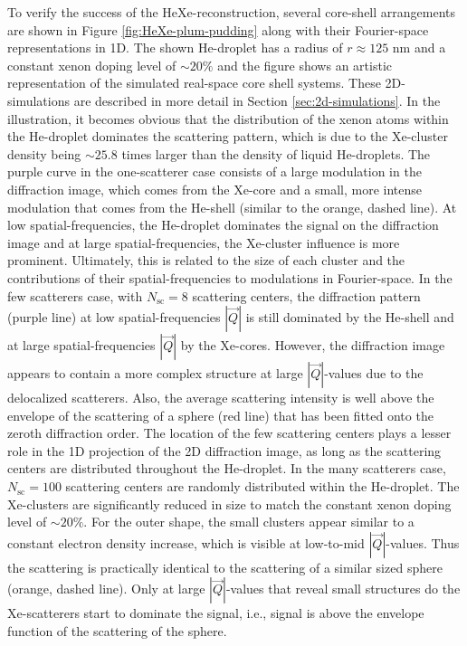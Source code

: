 To verify the success of the HeXe-reconstruction, several core-shell arrangements are shown in Figure \ref{fig:HeXe-plum-pudding} along with their Fourier-space representations in 1D. The shown He-droplet has a radius of $r\approx 125$ nm and a constant xenon doping level of $\sim 20\%$ and the figure shows an artistic representation of the simulated real-space core shell systems. These 2D-simulations are described in more detail in Section \ref{sec:2d-simulations}. In the illustration, it becomes obvious that the distribution of the xenon atoms within the He-droplet dominates the scattering pattern, which is due to the Xe-cluster density being $\sim 25.8$ times larger than the density of liquid He-droplets. The purple curve in the one-scatterer case consists of a large modulation in the diffraction image, which comes from the Xe-core and a small, more intense modulation that comes from the He-shell (similar to the orange, dashed line). At low spatial-frequencies, the He-droplet dominates the signal on the diffraction image and at large spatial-frequencies, the Xe-cluster influence is more prominent. Ultimately, this is related to the size of each cluster and the contributions of their spatial-frequencies to modulations in Fourier-space. In the few scatterers case, with $N_{\text{sc}}=8$ scattering centers, the diffraction pattern (purple line) at low spatial-frequencies $\left|\vec{Q}\right|$ is still dominated by the He-shell and at large spatial-frequencies $\left|\vec{Q}\right|$ by the Xe-cores. However, the diffraction image appears to contain a more complex structure at large $\left|\vec{Q}\right|$-values due to the delocalized scatterers. Also, the average scattering intensity is well above the envelope of the scattering of a sphere (red line) that has been fitted onto the zeroth diffraction order. The location of the few scattering centers plays a lesser role in the 1D projection of the 2D diffraction image, as long as the scattering centers are distributed throughout the He-droplet. In the many scatterers case, $N_{\text{sc}}=100$ scattering centers are randomly distributed within the He-droplet. The Xe-clusters are significantly reduced in size to match the constant xenon doping level of $\sim 20 \%$. For the outer shape, the small clusters appear similar to a constant electron density increase, which is visible at low-to-mid $\left|\vec{Q}\right|$-values. Thus the scattering is practically identical to the scattering of a similar sized sphere (orange, dashed line). Only at large $\left|\vec{Q}\right|$-values that reveal small structures do the Xe-scatterers start to dominate the signal, i.e., signal is above the envelope function of the scattering of the sphere.\\[1\baselineskip]

